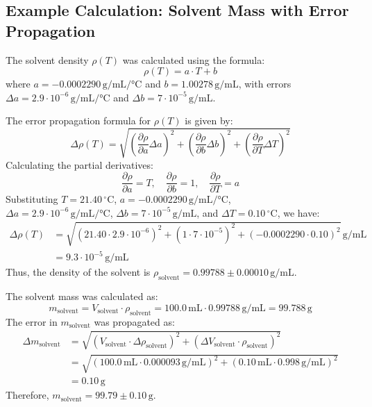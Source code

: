 \documentclass[a4paper,12pt]{article}
\begin{document}
\subsection*{Example Calculation: Solvent Mass with Error Propagation}
The solvent density \(\rho(T)\) was calculated using the formula:
\[
\rho(T) = a \cdot T + b
\]
where \(a = -0.0002290 \, \si{\gram\per\milli\liter\per\celsius}\) and \(b = 1.00278 \, \si{\gram\per\milli\liter}\), with errors \\ \(\Delta a = 2.9 \cdot 10^{-6} \, \si{\gram\per\milli\liter\per\celsius}\) and \(\Delta b = 7 \cdot 10^{-5} \,\si{\gram\per\milli\liter}\).

The error propagation formula for \(\rho(T)\) is given by:
\[
\Delta \rho(T) = \sqrt{\left(\frac{\partial \rho}{\partial a} \Delta a\right)^2 + \left(\frac{\partial \rho}{\partial b} \Delta b\right)^2 + \left(\frac{\partial \rho}{\partial T} \Delta T\right)^2}
\]
Calculating the partial derivatives:
\[
\frac{\partial \rho}{\partial a} = T, \quad \frac{\partial \rho}{\partial b} = 1, \quad \frac{\partial \rho}{\partial T} = a
\]
Substituting \(T = 21.40 \, ^\circ\text{C}\), \(a = -0.0002290 \, \si{\gram\per\milli\liter\per\celsius}\), \\ \(\Delta a = 2.9 \cdot 10^{-6} \, \si{\gram\per\milli\liter\per\celsius}\), \(\Delta b = 7 \cdot 10^{-5} \, \si{\gram\per\milli\liter}\), and \(\Delta T = 0.10 \, ^\circ\text{C}\), we have:
\begin{align*}
\Delta \rho(T) &= \sqrt{(21.40 \cdot 2.9 \cdot 10^{-6})^2 + (1 \cdot 7 \cdot 10^{-5})^2 + (-0.0002290 \cdot 0.10)^2} \,\si{\gram\per\milli\liter} \\ 
&= 9.3 \cdot 10^{-5} \, \si{\gram\per\milli\liter}  
\end{align*}
Thus, the density of the solvent is \(\rho_{\text{solvent}} = 0.99788 \pm 0.00010 \,\si{\gram\per\milli\liter}\).

The solvent mass was calculated as:
\[
m_{\text{solvent}} = V_{\text{solvent}} \cdot \rho_{\text{solvent}} = 100.0 \, \text{mL} \cdot 0.99788 \, \text{g/mL} = 99.788 \, \text{g}
\]
The error in \(m_{\text{solvent}}\) was propagated as:
\begin{align*}
\Delta m_{\text{solvent}} &= \sqrt{ \left(V_{\text{solvent}} \cdot \Delta \rho_{\text{solvent}}\right)^2 + \left(\Delta V_{\text{solvent}} \cdot \rho_{\text{solvent}}\right)^2} \\
&= \sqrt{\left(100.0 \, \text{mL} \cdot 0.000093 \, \si{\gram\per\milli\liter}\right)^2 + \left(0.10 \,\text{mL} \cdot 0.998 \, \si{\gram\per\milli\liter}\right)^2} \\
&= 0.10 \, \text{g}
\end{align*}
Therefore, \(m_{\text{solvent}} = 99.79 \pm 0.10 \, \text{g}\).
\end{document}
